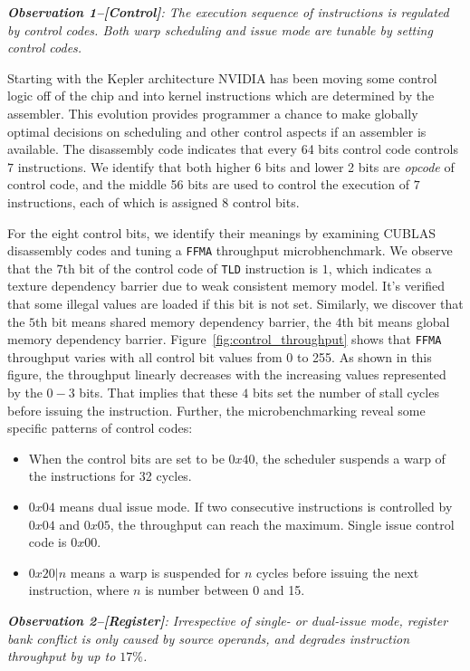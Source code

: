 {\em {\bf Observation 1--[Control]}: The execution sequence of instructions is regulated by control codes. Both warp scheduling and issue mode are tunable by setting control codes.}

Starting with the Kepler architecture NVIDIA has been moving some control logic off of the chip and into kernel instructions which are determined by the assembler. This evolution provides programmer a chance to make globally optimal decisions on scheduling and other control aspects if an assembler is available. The disassembly code indicates that every 64 bits control code controls $7$ instructions. We identify that both higher $6$ bits and lower 2 bits are {\em opcode} of control code, and the middle 56 bits are used to control the execution of $7$ instructions, each of which is assigned $8$ control bits.

For the eight control bits, we identify their meanings by examining CUBLAS disassembly codes and tuning a {\tt FFMA}
throughput microbhenchmark. We observe that the $7$th bit of the control code of {\tt TLD} instruction is $1$, which
indicates a texture dependency barrier due to weak consistent memory model. It's verified that some illegal values are
loaded if this bit is not set. Similarly, we discover that the $5$th bit means shared memory dependency barrier, the
$4$th bit means global memory dependency barrier. Figure~\ref{fig:control_throughput} shows that {\tt FFMA} throughput varies with all control bit values from 0 to 255. As shown in this figure, the throughput linearly decreases with the increasing values represented by the $0-3$ bits. That implies that these $4$ bits set the number of stall cycles before issuing the instruction. Further, the microbenchmarking reveal some specific patterns of control codes:

\begin{itemize}
\item When the control bits are set to be $0x40$, the scheduler suspends a warp of the instructions for 32 cycles.
\item $0x04$ means dual issue mode. If two consecutive instructions is controlled by $0x04$ and $0x05$, the throughput can reach the maximum. Single issue control code is $0x00$.
\item $0x20|n$ means a warp is suspended for $n$ cycles before issuing the next instruction, where $n$ is number between 0 and 15.
\end{itemize}


{\em {\bf Observation 2--[Register]}: Irrespective of single- or dual-issue mode, register bank conflict is only caused by source operands, and degrades instruction throughput by up to $17\%$.}

